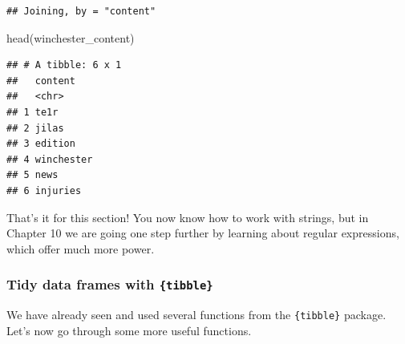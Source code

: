 \documentclass[
]{article}
\newenvironment{Shaded}{\begin{snugshade}}{\end{snugshade}}
\newcommand{\DecValTok}[1]{\textcolor[rgb]{0.00,0.00,0.81}{#1}}
\newcommand{\FunctionTok}[1]{\textcolor[rgb]{0.00,0.00,0.00}{#1}}
\newcommand{\NormalTok}[1]{#1}
\newcommand{\OtherTok}[1]{\textcolor[rgb]{0.56,0.35,0.01}{#1}}
\newcommand{\SpecialCharTok}[1]{\textcolor[rgb]{0.00,0.00,0.00}{#1}}
\newcommand{\StringTok}[1]{\textcolor[rgb]{0.31,0.60,0.02}{#1}}
\begin{document}
\begin{Shaded}
\end{Shaded}

\begin{verbatim}
## Joining, by = "content"
\end{verbatim}

\begin{Shaded}
\begin{Highlighting}[]
\FunctionTok{head}\NormalTok{(winchester\_content)}
\end{Highlighting}
\end{Shaded}

\begin{verbatim}
## # A tibble: 6 x 1
##   content   
##   <chr>     
## 1 te1r      
## 2 jilas     
## 3 edition   
## 4 winchester
## 5 news      
## 6 injuries
\end{verbatim}

That's it for this section! You now know how to work with strings, but in Chapter 10 we are going
one step further by learning about regular expressions, which offer much more power.

\hypertarget{tidy-data-frames-with-tibble}{%
\subsubsection{\texorpdfstring{Tidy data frames with \texttt{\{tibble\}}}{Tidy data frames with \{tibble\}}}\label{tidy-data-frames-with-tibble}}

We have already seen and used several functions from the \texttt{\{tibble\}} package. Let's now go through
some more useful functions.
\end{document}

